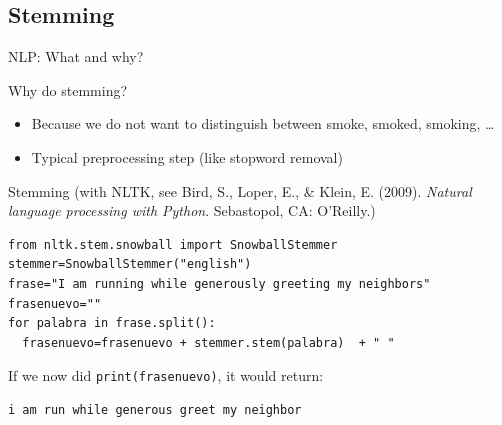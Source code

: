 \documentclass{beamer}
\begin{document}
	
	


\subsection{Stemming}
\begin{frame}{NLP: What and why?}
\begin{block}{Why do stemming?}
	\begin{itemize}
		\item Because we do not want to distinguish between smoke, smoked, smoking, \ldots
		\item Typical preprocessing step (like stopword removal)
	\end{itemize}
\end{block}
\end{frame}









\begin{frame}[fragile]{Stemming}
{\footnotesize{(with NLTK, see Bird, S., Loper, E., \& Klein, E. (2009). \emph{Natural language processing with Python}. Sebastopol, CA: O’Reilly.)}}
\begin{lstlisting}
from nltk.stem.snowball import SnowballStemmer
stemmer=SnowballStemmer("english")
frase="I am running while generously greeting my neighbors"
frasenuevo=""
for palabra in frase.split():
  frasenuevo=frasenuevo + stemmer.stem(palabra)  + " "
\end{lstlisting}
If we now did {\tt{print(frasenuevo)}}, it would return:
\begin{lstlisting}
i am run while generous greet my neighbor
\end{lstlisting}
\end{frame}
\end{document}
